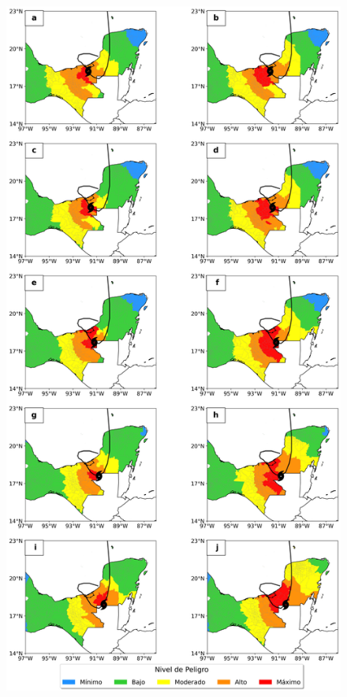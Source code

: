 \begin{frame}
\begin{columns}
\begin{column}{0.5\textwidth}
\begin{figure}
        \includegraphics[scale = 0.135]{Images/Figures/Fig_4_1.jpeg}
        \label{fig:fig_conclusion}
    \end{figure}
    \end{column}
\end{columns}
\end{frame}

